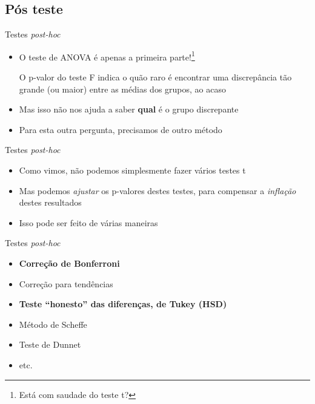 \documentclass{beamer}
\begin{document}
\subsection{Pós teste}

\begin{frame}{\scriptsize Testes {\em post-hoc}}
  \begin{itemize}
    \footnotesize
  \item O teste de ANOVA é apenas a primeira parte!\footnote{Está com saudade do teste t?}
    \bigskip
    \bigskip
    \begin{block}{}
      O p-valor do teste F indica o quão raro é encontrar uma discrepância tão grande (ou maior) entre as médias dos grupos, ao acaso
    \end{block}
    \bigskip
    \bigskip
  \item Mas isso não nos ajuda a saber {\bf qual} é o grupo discrepante
  \item Para esta outra pergunta, precisamos de outro método
  \end{itemize}
\end{frame}

\begin{frame}{\scriptsize Testes {\em post-hoc}}
  \begin{itemize}
    \footnotesize
  \item Como vimos, não podemos simplesmente fazer vários testes t
    \bigskip
    \bigskip
  \item Mas podemos {\em ajustar} os p-valores destes testes, para compensar a {\em inflação} destes resultados
    \bigskip
    \bigskip
  \item Isso pode ser feito de várias maneiras
  \end{itemize}
\end{frame}

\begin{frame}{\scriptsize Testes {\em post-hoc}}
  \begin{itemize}
    \footnotesize
  \item {\bf Correção de Bonferroni}
  \item Correção para tendências
  \item {\bf Teste ``honesto'' das diferenças, de Tukey (HSD)}
  \item Método de Scheffe
  \item Teste de Dunnet
  \item etc.
  \end{itemize}
\end{frame}
\end{document}
